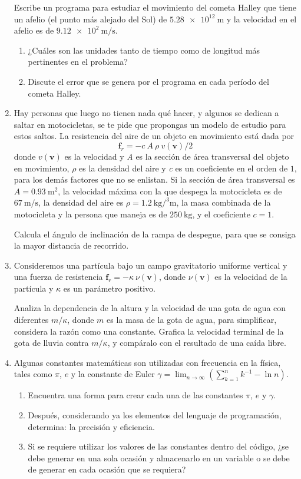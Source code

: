\begin{enumerate}
\par
Escribe un programa para estudiar el movimiento del cometa Halley que tiene un afelio (el punto más alejado del Sol) de $\SI{5.28e12}{\meter}$ y la velocidad en el afelio es de $\SI{9.12e2}{\meter\per\second}$.
\begin{enumerate}
\item ¿Cuáles son las unidades tanto de tiempo como de longitud más pertinentes en el problema?
\item Discute el error que se genera por el programa en cada período del cometa Halley.
\end{enumerate}
\item Hay personas que luego no tienen nada qué hacer, y algunos se dedican a saltar en motocicletas, se te pide que propongas un modelo de estudio para estos saltos. La resistencia del aire de un objeto en movimiento está dada por 
\[ \textbf{f}_{r} = - c \: A \: \rho \: v(\textbf{v})/2 \]
donde $v(\textbf{v})$ es la velocidad y \textit{A} es la sección de área transversal del objeto en movimiento, $\rho$ es la densidad del aire y \textit{c} es un coeficiente en el orden de $1$, para los demás factores que no se enlistan. Si la sección de área transversal es $A = \SI{0.93}{\square\meter}$, la velocidad máxima con la que despega la motocicleta es de $\SI{67}{\meter\per\second}$, la densidad del aire es $\rho = \SI{1.2}{\kilo\gram\per\cubed\meter}$, la masa combinada de la motocicleta y la persona que maneja es de $\SI{250}{\kilo\gram}$, y el coeficiente $c = 1$.
\par
Calcula el ángulo de inclinación de la rampa de despegue, para que se consiga la mayor distancia de recorrido.
\item Consideremos una partícula bajo un campo gravitatorio uniforme vertical y una fuerza de resistencia $\mathbf{f}_{r} = - \kappa \: \nu(\mathbf{v})$, donde $\nu(\mathbf{v})$ es la velocidad de la partícula y $\kappa$ es un parámetro positivo.
\par
Analiza la dependencia de la altura y la velocidad de una gota de agua con diferentes $m/\kappa$, donde $m$ es la masa de la gota de agua, para simplificar, considera la razón como una constante. Grafica la velocidad terminal de la gota de lluvia contra $m/\kappa$, y compáralo con el resultado de una caída libre.
\item Algunas constantes matemáticas son utilizadas con frecuencia en la física, tales como $\pi$, $e$ y la constante de Euler $\gamma = \lim_{n \rightarrow \infty} (\sum_{k = 1}^{n} k^{ - 1} - \ln n)$.
\par
\begin{enumerate}
\item Encuentra una forma para crear cada una de las constantes $\pi$, $e$ y $\gamma$.
\item Después, considerando ya los elementos del lenguaje de programación, determina: la precisión y eficiencia. 
\item Si se requiere utilizar los valores de las constantes dentro del código, ¿se debe generar en una sola ocasión y almacenarlo en un variable o se debe de generar en cada ocasión que se requiera?
\end{enumerate}
\end{enumerate}
